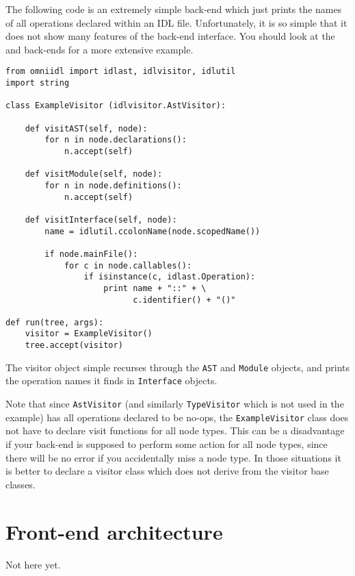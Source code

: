 \documentclass[11pt,twoside,a4paper]{article}
\newcommand{\class}[1]{\texttt{#1}}
\newcommand{\file}{\begingroup \urlstyle{tt}\Url}
\begin{document}
The following code is an extremely simple back-end which just prints
the names of all operations declared within an IDL file.
Unfortunately, it is so simple that it does not show many features of
the back-end interface. You should look at the \file{dump.py} and
\file{python.py} back-ends for a more extensive example.

\begin{verbatim}
from omniidl import idlast, idlvisitor, idlutil
import string

class ExampleVisitor (idlvisitor.AstVisitor):

    def visitAST(self, node):
        for n in node.declarations():
            n.accept(self)

    def visitModule(self, node):
        for n in node.definitions():
            n.accept(self)

    def visitInterface(self, node):
        name = idlutil.ccolonName(node.scopedName())

        if node.mainFile():
            for c in node.callables():
                if isinstance(c, idlast.Operation):
                    print name + "::" + \
                          c.identifier() + "()"

def run(tree, args):
    visitor = ExampleVisitor()
    tree.accept(visitor)
\end{verbatim}

\noindent
The visitor object simple recurses through the \class{AST} and
\class{Module} objects, and prints the operation names it finds in
\class{Interface} objects.

Note that since \class{AstVisitor} (and similarly \class{TypeVisitor}
which is not used in the example) has all operations declared to be
no-ops, the \class{ExampleVisitor} class does not have to declare
visit functions for all node types. This can be a disadvantage if your
back-end is supposed to perform some action for all node types, since
there will be no error if you accidentally miss a node type. In those
situations it is better to declare a visitor class which does not
derive from the visitor base classes.



\section{Front-end architecture}

Not here yet.
\end{document}
